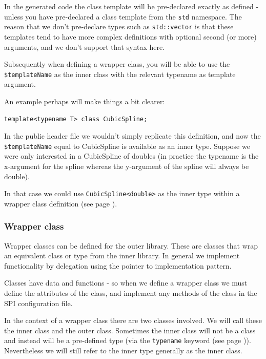 In the generated code the class template will be pre-declared exactly as defined - unless you have pre-declared a class template from the \texttt{std} namespace.
The reason that we don't pre-declare types such as \texttt{std::vector} is that these templates tend to have more complex definitions with optional second (or more) arguments, and we don't support that syntax here.

Subsequently when defining a wrapper class, you will be able to use the \texttt{\$templateName} as the inner class with the relevant typename as template argument.

An example perhaps will make things a bit clearer:
\begin{verbatim}
template<typename T> class CubicSpline;
\end{verbatim}

In the public header file we wouldn't simply replicate this definition, and now the \texttt{\$templateName} equal to CubicSpline is available as an inner type.
Suppose we were only interested in a CubicSpline of doubles (in practice the typename is the x-argument for the spline whereas the y-argument of the spline will always be double).

In that case we could use \verb|CubicSpline<double>| as the inner type within a wrapper class definition (see page \pageref{class}).

\newpage
\subsubsection{Wrapper class} \label{class}

Wrapper classes can be defined for the outer library.
These are classes that wrap an equivalent class or type from the inner library.
In general we implement functionality by delegation using the pointer to implementation pattern.

Classes have data and functions - so when we define a wrapper class we must define the attributes of the class, and implement any methods of the class in the SPI configuration file.

In the context of a wrapper class there are two classes involved.
We will call these the inner class and the outer class.
Sometimes the inner class will not be a class and instead will be a pre-defined type (via the \texttt{typename} keyword (see page \pageref{typename})).
Nevertheless we will still refer to the inner type generally as the inner class.

